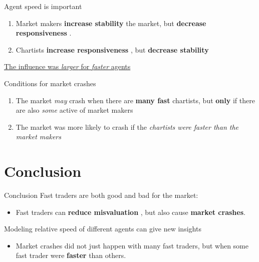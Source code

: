 \documentclass[14pt]{beamer}
\begin{document}
\begin{frame}{Agent speed is important}
\begin{enumerate}
\item Market makers \color{green} \textbf{increase stability} \color{black} the market, but \color{red} \textbf{decrease responsiveness} \color{black}.
\vspace{0.1in}
\pause
\item Chartists \color{green} \textbf{increase responsiveness} \color{black}, but \color{red} \textbf{decrease stability} \color{black}
\end{enumerate}
\vspace{0.2in}
\pause
\begin{center}
\large
\underline{The influence was \textit{larger} for \textit{faster} agents}
\end{center}
\end{frame}

\begin{frame}{Conditions for market crashes}
\begin{enumerate}
\item The market \textit{may} \color{red} crash \color{black} when there are \textbf{many fast} chartists, but \textbf{only} if there are also \textit{some} active of market makers \vspace{0.1in} \pause
\item The market was more likely to crash if the \textit{chartists were faster than the market makers}
\end{enumerate}
\end{frame}


\section{Conclusion}
\begin{frame}
\tableofcontents[currentsection]
\end{frame}

\begin{frame}{Conclusion}
Fast traders are both good and bad for the market:
\begin{itemize}
\item Fast traders can \color{green} \textbf{reduce misvaluation} \color{black}, but also cause \color{red} \textbf{market crashes}. \color{black}
\end{itemize}
\vspace{0.2in}
\pause
Modeling relative speed of different agents can give new insights
\begin{itemize}
\item Market crashes did not just happen with many fast traders, but when some fast trader were \textbf{faster} than others.
\end{itemize}
\end{frame}
\end{document}

